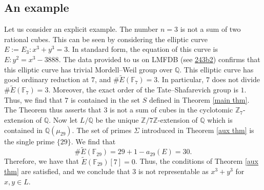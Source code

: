 \documentclass[11pt]{amsart}
\newcommand{\Z}{\mathbb{Z}}
\newcommand{\Q}{\mathbb{Q}}
\newcommand{\F}{\mathbb{F}}
\numberwithin{equation}{section}
\begin{document}
\subsection*{An example} Let us consider an explicit example. The number $n=3$ is not a sum of two rational cubes. This can be seen by considering the elliptic curve $E:=E_3: x^3+y^3=3$. In standard form, the equation of this curve is $E:y^2=x^3-3888$. The data provided to us on LMFDB (see \href{https://www.lmfdb.org/EllipticCurve/Q/243/b/1}{243b2}) confirms that this elliptic curve has trivial Mordell--Weil group over $\Q$. This elliptic curve has good ordinary reduction at $7$, and $\# \widetilde{E}(\F_7)=3$. In particular, $7$ does not divide $\# \widetilde{E}(\F_7)=3$. Moreover, the exact order of the Tate--Shafarevich group is $1$. Thus, we find that $7$ is contained in the set $S$ defined in Theorem \ref{main thm}. The Theorem thus asserts that $3$ is not a sum of cubes in the cyclotomic $\Z_7$-extension of $\Q$. Now let $L/\Q$ be the unique $\Z/7\Z$-extension of $\Q$ which is contained in $\Q(\mu_{29})$. The set of primes $\Sigma$ introduced in Theorem \ref{aux thm} is the single prime $\{29\}$. We find that 
\[\# \widetilde{E}(\F_{29})=29+1-a_{29}(E)=30.\] Therefore, we have that $\widetilde{E}(\F_{29})[7]=0$. Thus, the conditions of Theorem \ref{aux thm} are satisfied, and we conclude that $3$ is not representable as $x^3+y^3$ for $x,y\in L$.



\end{document}
